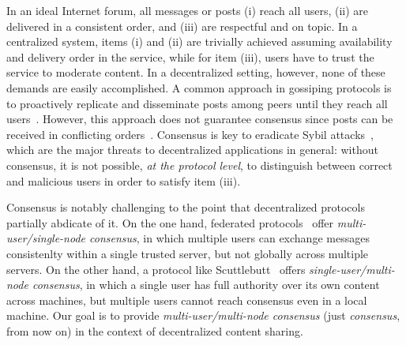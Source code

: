 \documentclass[10pt,journal,compsoc]{IEEEtran}
\begin{document}
In an ideal Internet forum, all messages or posts
(i)   reach all users,
(ii)  are delivered in a consistent order, and
(iii) are respectful and on topic.
In a centralized system, items (i) and (ii) are trivially achieved assuming
availability and delivery order in the service, while for item (iii), users
have to trust the service to moderate content.
In a decentralized setting, however, none of these demands are easily
accomplished.
A common approach in gossiping protocols is to proactively replicate and
disseminate posts among peers until they reach all
users~\cite{p2p.survey,p2p.byz}.
However, this approach does not guarantee consensus since posts can be received
in conflicting orders~\cite{p2p.intention,p2p.dvcs}.
%
Consensus is key to eradicate Sybil attacks~\cite{p2p.sybil}, which are the
major threats to decentralized applications in general: without consensus, it
is not possible, \emph{at the protocol level}, to distinguish between correct
and malicious users in order to satisfy item (iii).

Consensus is notably challenging to the point that decentralized protocols
partially abdicate of it.
%
On the one hand, federated protocols~\cite{p2p.ecosystem} offer
\emph{multi-user/single-node consensus}, in which multiple users can exchange
messages consistenlty within a single trusted server, but not globally across
multiple servers.
%
On the other hand, a protocol like Scuttlebutt~\cite{p2p.scuttlebutt} offers
\emph{single-user/multi-node consensus}, in which a single user has full
authority over its own content across machines, but multiple users cannot reach
consensus even in a local machine.
%
Our goal is to provide \emph{multi-user/multi-node consensus} (just
\emph{consensus}, from now on) in the context of decentralized content sharing.
\end{document}
